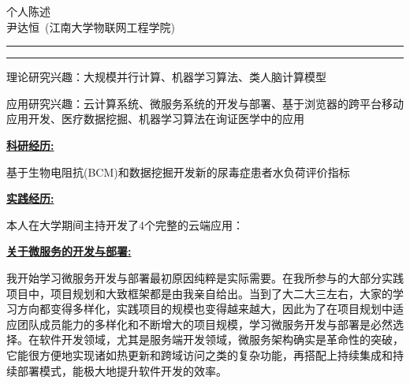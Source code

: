 \documentclass[a4paper]{ctexart}
\newcommand{\soptitle}{个人陈述}
\newcommand{\yourname}{尹达恒}
\newcommand{\statement}[1]{\par\medskip
  \underline{\textbf{#1:}}\space
}
\begin{document}
\begin{center}\LARGE\soptitle\\
	\large\yourname\ (江南大学物联网工程学院)
\end{center}

\hrule
\vspace{1pt}
\hrule height 1pt

\bigskip

\renewcommand{\baselinestretch}{1.3}
理论研究兴趣：大规模并行计算、机器学习算法、类人脑计算模型

应用研究兴趣：云计算系统、微服务系统的开发与部署、基于浏览器的跨平台移动应用开发、医疗数据挖掘、机器学习算法在询证医学中的应用

\statement{科研经历}
基于生物电阻抗(BCM)和数据挖掘开发新的尿毒症患者水负荷评价指标

\statement{实践经历}
本人在大学期间主持开发了4个完整的云端应用：

\statement{关于微服务的开发与部署}
我开始学习微服务开发与部署最初原因纯粹是实际需要。在我所参与的大部分实践项目中，项目规划和大致框架都是由我亲自给出。当到了大二大三左右，大家的学习方向都变得多样化，实践项目的规模也变得越来越大，因此为了在项目规划中适应团队成员能力的多样化和不断增大的项目规模，学习微服务开发与部署是必然选择。在软件开发领域，尤其是服务端开发领域，微服务架构确实是革命性的突破，它能很方便地实现诸如热更新和跨域访问之类的复杂功能，再搭配上持续集成和持续部署模式，能极大地提升软件开发的效率。

\pagestyle{empty}
\thispagestyle{empty}
\end{document}
